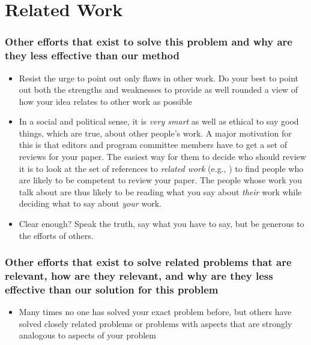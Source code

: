 \documentclass[11pt]{article}
\begin{document}
\section{Related Work}
\label{sec:RelatedWork}

\subsubsection*{Other efforts that exist to solve this problem and why are they
less effective than our method}

\begin{itemize}
\item
Resist the urge to point out only flaws in other work. Do your best to point
out both the strengths and weaknesses to provide as well rounded a view of how
your idea relates to other work as possible

\item
In a social and political sense, it is {\em very smart} as well as ethical to
say good things, which are true, about other people's work. A major motivation
for this is that editors and program committee members have to get a set of
reviews for your paper. The easiest way for them to decide who should review it
is to look at the set of references to {\em related work} (e.g.,
\cite{ARJ:95,BHR:90,Go:97}) to find people who are likely to be competent to
review your paper.  The people whose work you talk about are thus likely to be
reading what you say about {\em their} work while deciding what to say about
{\em your} work. 

\item
Clear enough? Speak the truth, say what you have to say, but be generous to the
efforts of others.

\end{itemize}


\subsubsection*{Other efforts that exist to solve related problems that are
relevant, how are they relevant, and why are they less effective than our
solution for this problem}

\begin{itemize}
\item 
Many times no one has solved your exact problem before, but others have solved
closely related problems or problems with aspects that are strongly analogous
to aspects of your problem

\end{itemize}
\end{document}
